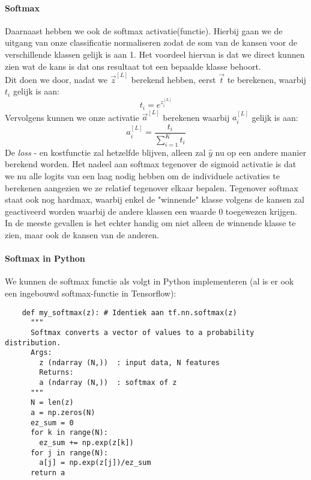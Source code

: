 \paragraph{Softmax}
\label{ch:softmax}
Daarnaast hebben we ook de softmax activatie(functie). Hierbij gaan we de uitgang van onze classificatie normaliseren zodat de som van de kansen voor de verschillende klassen gelijk is aan 1. Het voordeel hiervan is dat we direct kunnen zien wat de kans is dat ons resultaat tot een bepaalde klasse behoort.\\
\newline
Dit doen we door, nadat we $\vec{z}^{[L]}$ berekend hebben, eerst $\vec{t}$ te berekenen, waarbij $t_{i}$ gelijk is aan:
\begin{equation}
	t_{i} = e^{z_{i}^{[L]}}
\end{equation}
\noindent
Vervolgens kunnen we onze activatie $\vec{a}^{[L]}$ berekenen waarbij $a_{i}^{[L]}$ gelijk is aan:
\begin{equation}
	a_{i}^{[L]} = \frac{t_{i}}{\sum_{i=1}^{K} t_{i}}
\end{equation}
\noindent
De \textit{loss} - en kostfunctie zal hetzelfde blijven, alleen zal $\hat{y}$ nu op een andere manier berekend worden. Het nadeel aan softmax tegenover de sigmoid activatie is dat we nu alle logits van een laag nodig hebben om de individuele activaties te berekenen aangezien we ze relatief tegenover elkaar bepalen. Tegenover softmax staat ook nog hardmax, waarbij enkel de "winnende" klasse volgens de kansen zal geactiveerd worden waarbij de andere klassen een waarde 0 toegewezen krijgen. In de meeste gevallen is het echter handig om niet alleen de winnende klasse te zien, maar ook de kansen van de anderen.

\paragraph{Softmax in Python}

We kunnen de softmax functie als volgt in Python implementeren (al is er ook een ingebouwd softmax-functie in Tensorflow):

\begin{lstlisting}
	def my_softmax(z): # Identiek aan tf.nn.softmax(z)
	  """ 
	  Softmax converts a vector of values to a probability distribution.
	  Args:
	    z (ndarray (N,))  : input data, N features
	    Returns:
	    a (ndarray (N,))  : softmax of z
	  """
	  N = len(z)
	  a = np.zeros(N)
	  ez_sum = 0
	  for k in range(N):                
	    ez_sum += np.exp(z[k])       
	  for j in range(N):                
	    a[j] = np.exp(z[j])/ez_sum   
	  return a
\end{lstlisting}

